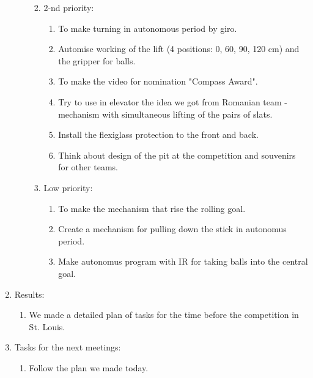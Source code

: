 \begin{enumerate}
\begin{enumerate}
\begin{enumerate}
\begin{enumerate}
			\end{enumerate}
			
			\item 2-nd priority:
			\begin{enumerate}
				
				\item To make turning in autonomous period by giro.
				
				\item Automise working of the lift (4 positions: 0, 60, 90, 120 cm) and the gripper for balls.
				
				\item To make the video for nomination "Compass Award".
				
				\item Try to use in elevator the idea we got from Romanian team - mechanism with simultaneous lifting of the pairs of slats.
				
				\item Install the flexiglass protection to the front and back.
				
				\item Think about design of the pit at the competition and souvenirs for other teams.
				
			\end{enumerate}
			
			\item Low priority:
			\begin{enumerate}
				
				\item To make the mechanism that rise the rolling goal.
				
				\item Create a mechanism for pulling down the stick in autonomus period.
				
				\item Make autonomus program with IR for taking balls into the central goal.
				
			\end{enumerate}
		\end{enumerate}
		
	\end{enumerate}
	
	\item Results:
	\begin{enumerate}
		
		\item We made a detailed plan of tasks for the time before the competition in St. Louis.
		
	\end{enumerate}
	
	\item Tasks for the next meetings:
	\begin{enumerate}
		
		\item Follow the plan we made today.
			
	\end{enumerate}
\end{enumerate}
\fillpage
